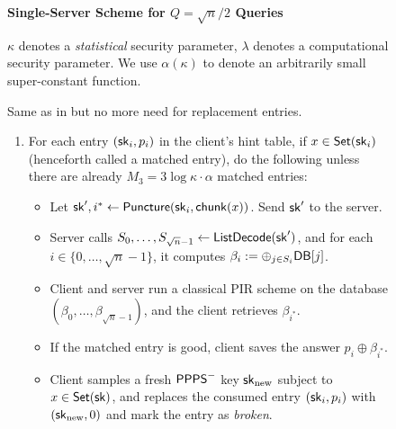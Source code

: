 \begin{figure}[t]
    \begin{minipage}{\textwidth}
        \begin{mdframed}
            \label{alg:full}
            \begin{center}
                {\bf Single-Server Scheme for $Q=\sqrt{n}/2$ Queries}
            \end{center}
            $\kappa$ denotes a {\it statistical} security parameter, $\lambda$
            denotes a computational security parameter. We use $\alpha(\kappa)$
            to denote an arbitrarily small super-constant function.
 
           Same as in  
but no more need for replacement entries.

                \begin{enumerate}[leftmargin=5mm,itemsep=1pt]
\item 
 For each entry $(\mathsf{sk}_i, p_i)$
in the client's hint table, 
if $x \in \mathsf{Set}(\mathsf{sk}_i)$ (henceforth called a matched entry),  do the following unless there are already $M_3 = 3 \log \kappa \cdot \alpha$ matched entries: 
\begin{itemize}[leftmargin=2mm]
\item 
Let $\mathsf{sk}', i^* \leftarrow {\sf Puncture}(\mathsf{sk}_i, {\sf chunk}(x))$.
Send $\mathsf{sk}'$ to the server. 
\item 
Server calls $S_0, \ldots, S_{\sqrt{n}-1} \leftarrow {\sf ListDecode}(\mathsf{sk}')$,
and for each $i \in \{0, \ldots, \sqrt{n}-1\}$,
it computes $\beta_i := \oplus_{j \in S_i} \mathsf{DB}[j]$.
\item 
Client and server run a classical PIR scheme on the database
$(\beta_0, \ldots, \beta_{\sqrt{n}-1})$, and the client
retrieves $\beta_{i^*}$.
\item 
If the matched entry is good, client saves the answer 
$p_i \oplus \beta_{i^*}$.
\item 
Client samples a fresh 
${\sf PPPS}^-$ key $\mathsf{sk}_{\rm new}$ subject to $x \in \mathsf{Set}(\mathsf{sk})$, and 
replaces the 
consumed entry $(\mathsf{sk}_i, p_i)$ with 
$(\mathsf{sk}_{\rm new}, 0)$
and mark the entry as {\it broken}.
\end{itemize}


\end{enumerate}
\end{mdframed}
\end{minipage}
\end{figure}
